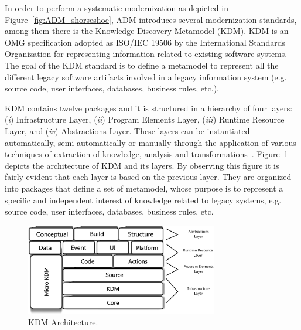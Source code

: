 In order to perform a systematic modernization as depicted in Figure~\ref{fig:ADM_shorseshoe}, ADM introduces several modernization standards, among them there is the Knowledge Discovery Metamodel (KDM).
KDM is an OMG specification adopted as ISO/IEC 19506 by the International Standards Organization for representing information related to existing software systems. 
The goal of the KDM standard is to define a metamodel to represent all the different legacy software artifacts involved in a legacy information system (e.g. source code, user interfaces, databases, business rules, etc.). %

KDM contains twelve packages and it is structured in a hierarchy of four layers: (\textit{i}) Infrastructure Layer, (\textit{ii}) Program Elements Layer, (\textit{iii}) Runtime Resource Layer, and (\textit{iv}) Abstractions Layer. These layers can be instantiated automatically, semi-automatically or manually through the application of various techniques of extraction of knowledge, analysis and transformations~\cite{1686216}. Figure~\ref{fig:kdmLayers} depicts the architecture of KDM and its layers. By observing this figure it is fairly evident that each layer is based on the previous layer. They are organized into packages that define a set of metamodel, whose purpose is to represent a specific and independent interest of knowledge related to legacy systems, e.g. source code, user interfaces, databases, business rules, etc.

\begin{figure}[!ht]
\centering
 \includegraphics[width=3.3in]{figuras/camadas_kdm}
\caption{KDM Architecture.}
\label{fig:kdmLayers}
\end{figure}

